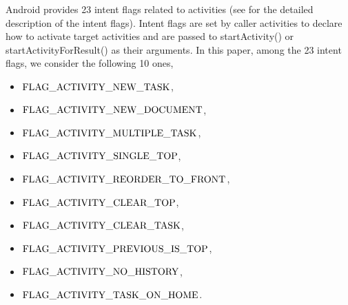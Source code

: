 Android provides 23 intent flags related to activities (see \cite{intentflags} for the detailed description of the intent flags). Intent flags are set by caller activities to declare how to activate target activities and are passed to startActivity() or startActivityForResult() as their arguments. 
In this paper, among the 23 intent flags, we consider the following 10 ones, 
\begin{itemize}
	\item $\rm FLAG\_ACTIVITY\_NEW\_TASK$,
	\item $\rm FLAG\_ACTIVITY\_NEW\_DOCUMENT$,
	\item $\rm FLAG\_ACTIVITY\_MULTIPLE\_TASK$,
	\item $\rm FLAG\_ACTIVITY\_SINGLE\_TOP$,
	\item $\rm FLAG\_ACTIVITY\_REORDER\_TO\_FRONT$,
	\item $\rm FLAG\_ACTIVITY\_CLEAR\_TOP$,
	\item $\rm FLAG\_ACTIVITY\_CLEAR\_TASK$,
	\item $\rm FLAG\_ACTIVITY\_PREVIOUS\_IS\_TOP$,
	\item $\rm FLAG\_ACTIVITY\_NO\_HISTORY$,
	\item $\rm FLAG\_ACTIVITY\_TASK\_ON\_HOME$.
\end{itemize}
